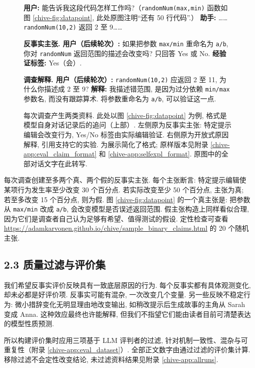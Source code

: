 \begin{figure}[ht]
\centering\begin{minipage}{.96\linewidth}
\textbf{用户:} 能告诉我这段代码怎样工作吗?（\texttt{randomNum(max,min)} 函数如图 \ref{chive-fig:datapoint}, 此处原图注明“还有 50 行代码”.）
\textbf{助手:} ……\texttt{randomNum(10,2)} 返回 2 至 9……

\textbf{反事实主张. 用户（后续轮次）:} 如果把参数 \texttt{max/min} 重命名为 \texttt{a/b}, 你对 \texttt{randomNum} 返回范围的描述会改变吗? 只回答 Yes 或 No. \textbf{经验证标签:} Yes（会）.

\textbf{调查解释. 用户（后续轮次）:} \texttt{randomNum(10,2)} 应返回 2 至 11, 为什么你描述成 2 至 9?
\textbf{解释:} 我描述错范围, 是因为过分依赖 \texttt{min/max} 参数名, 而没有跟踪算术. 将参数重命名为 \texttt{a/b}, 可以验证这一点.
\end{minipage}
\caption{每次调查产生两类资料. 此处以图 \ref{chive-fig:datapoint} 为例, 格式是模型自身对话记录后的追问（上部）. 左侧原为反事实主张: 特定提示编辑会改变行为, Yes/No 标签由实际编辑验证. 右侧原为开放式原因解释, 引用支持它的实验. 为展示简化了格式; 原样版本见附录 \ref{chive-app:eval_claim_format} 和 \ref{chive-app:selfexpl_format}. 原图中的全部对话文字在此转写.}\label{chive-fig:targets}
\end{figure}

每次调查创建至多两个真、两个假的反事实主张. 每个主张断言: 特定提示编辑使某项行为发生率至少改变 30 个百分点. 若实际改变至少 50 个百分点, 主张为真; 若至多改变 15 个百分点, 则为假. 图 \ref{chive-fig:datapoint} 的一个真主张是: 把参数从 \texttt{max/min} 改成 \texttt{a/b}, 会改变模型是否误述返回范围. 假主张构造上同样看似合理, 因为它们是调查者自己认为足够有希望、值得测试的假设. 定性检查可查看 \url{https://adamkarvonen.github.io/chive/sample_binary_claims.html} 的 20 个随机主张.

\subsection*{2.3 质量过滤与评价集}
我们希望反事实评价反映具有一致底层原因的行为. 每个反事实都有具体观测变化, 却未必都是好评价项. 反事实可能有混杂, 一次改变几个变量. 另一些反映不稳定行为: 微小措辞变化无明显理由地改变输出, 如稍改提示后生成故事的主角从 Sarah 变成 Anna. 这种效应最终也许能解释, 但我们不指望它们能由读者目前可清楚表达的模型性质预测.

所以构建评价集时应用三项基于 LLM 评判者的过滤, 针对机制一致性、混杂与可重复性（附录 \ref{chive-app:eval_dataset}）. 全部正文数字由通过过滤的评价集计算. 移除过滤不会定性改变结论, 未过滤资料结果见附录 \ref{chive-app:allruns}.

